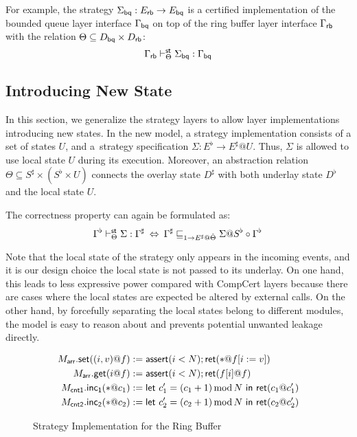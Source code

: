 \documentclass[acmsmall,review,anonymous]{acmart}\settopmatter{printfolios=true,printccs=false,printacmref=false}
\begin{document}
For example,
the strategy
$\Sigma_{ \mathsf{bq} }: E_{ \mathsf{rb} } \rightarrow E_{ \mathsf{bq} }$
is a certified implementation
of the bounded queue layer interface
$\Gamma_{ \mathsf{bq} }$
on top of the ring buffer layer interface
$\Gamma_{ \mathsf{rb} }$
with the relation
$\Theta \subseteq D_{ \mathsf{bq} } \times D_{ \mathsf{rb} }$:
\[
  \Gamma_{ \mathsf{rb} } \vdash^{ \mathsf{st} }_\Theta \Sigma_{ \mathsf{bq} } : \Gamma_{ \mathsf{bq} }
\]


\subsection{Introducing New State} %
\label{sec:stcal:state}



In this section,
we generalize the strategy layers
to allow layer implementations
introducing new states.
In the new model,
a strategy implementation consists of
a set of states $U$,
and a~strategy specification $\Sigma : E^\flat \rightarrow E^\sharp @U$.
Thus, $\Sigma$ is allowed to
use local state $U$ during its execution.
Moreover, an abstraction relation
$\Theta \subseteq S^\sharp \times (S^\flat \times U)$
connects the overlay state $D^\sharp$
with both underlay state $D^\flat$
and the local state $U$.

The correctness property can again be formulated as:
\[
  \Gamma^\flat \vdash^\kw{st}_\Theta \Sigma : \Gamma^\sharp
  \:\Leftrightarrow\:
  \Gamma^\sharp \sqsubseteq_{1 \rightarrow E^\sharp@\hat{\Theta}}
  \Sigma@S^\flat \circ \Gamma^\flat
  \,
\]

Note that
the local state of the strategy
only appears in the incoming events,
and it is our design choice
the local state is not passed
to its underlay.
On one hand, this leads to less expressive power
compared with CompCert layers
because there are cases
where the local states are expected be altered
by external calls.
On the other hand, by forcefully separating
the local states belong to different modules,
the model is easy to reason about
and prevents potential unwanted leakage directly.

\begin{figure*}
  \centering
  \begin{align*}
    M_\kw{arr}.\kw{set}((i,v)@f)
    & := \kw{assert}(i < N); \kw{ret}(*@f[i:=v])\\
    M_\kw{arr}.\kw{get}(i@f)
    & := \kw{assert}(i < N); \kw{ret}(f[i]@f)\\
    M_\kw{cnt1}.\kw{inc_1}(*@c_1)
    &:= \kw{let}\ c'_1 = (c_1+1)\mathop{\mathrm{mod}} N\ \kw{in}\ \kw{ret}(c_1@c'_1)\\
    M_\kw{cnt2}.\kw{inc_2}(*@c_2)
    & := \kw{let}\ c'_2 = (c_2+1)\mathop{\mathrm{mod}} N\ \kw{in}\ \kw{ret}(c_2@c'_2)
  \end{align*}
  \caption{Strategy Implementation for the Ring Buffer}
  \label{fig:mrb}
\end{figure*}
\end{document}
